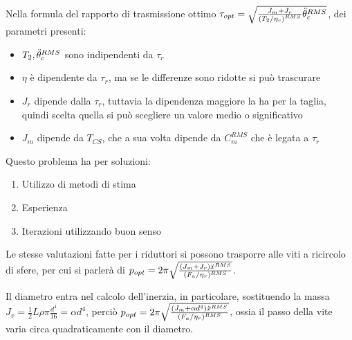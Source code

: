 Nella formula del rapporto di trasmissione ottimo  \(\tau_{opt} = \sqrt{\frac{J_m + J_r}{\left(T_2/\eta_r\right)^{RMS}}\Ddot{\theta}_c^{RMS}}\), dei parametri presenti:
\begin{itemize}
    \item \(T_2, \Ddot{\theta}_c^{RMS}\) sono indipendenti da \(\tau_r\)
    \item \(\eta\) è dipendente da \(\tau_r\), ma se le differenze sono ridotte si può trascurare
    \item \(J_r\) dipende dalla \(\tau_r\), tuttavia la dipendenza maggiore la ha per la taglia, quindi scelta quella si può scegliere un valore medio o significativo
    \item \(J_m\) dipende da \(T_{CS}\), che a sua volta dipende da \(C_m^{RMS}\) che è legata a \(\tau_r\)
\end{itemize}

Questo problema ha per soluzioni:
\begin{enumerate}[label=\Roman*]
    \item Utilizzo di metodi di stima
    \item Esperienza
    \item Iterazioni utilizzando buon senso
\end{enumerate}

Le stesse valutazioni fatte per i riduttori si possono trasporre alle viti a ricircolo di sfere, per cui si parlerà di \(p_{opt}=2\pi \sqrt{\frac{(J_m+J_r)\Ddot{x}^{RMS}}{(F_a/\eta_r)^{RMS}}}\).

Il diametro entra nel calcolo dell'inerzia, in particolare, sostituendo la massa \(J_v=\frac{1}{2}L\rho \pi \frac{d^4}{16} = \alpha d^4\), perciò \(p_{opt}=2\pi \sqrt{\frac{(J_m+\alpha d^4)\Ddot{x}^{RMS}}{(F_a/\eta_r)^{RMS}}}\), ossia il passo della vite varia circa quadraticamente con il diametro.

